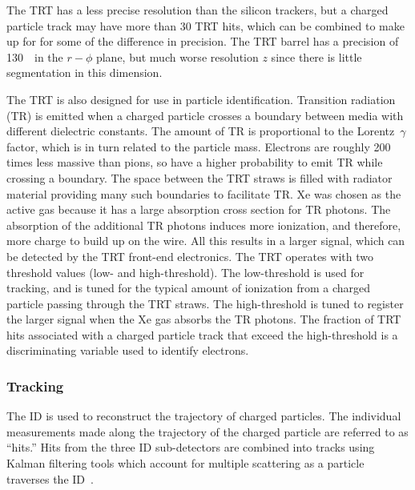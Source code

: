 The TRT has a less precise resolution than the silicon trackers, but a charged
particle track may have more than 30 TRT hits, which can be combined to make
up for for some of the difference in precision.
The TRT barrel has a precision of 130~\um\  in the $r-\phi$ plane, but much
worse resolution $z$ since there is little segmentation in this dimension.

The TRT is also designed for use in particle identification.
Transition radiation (TR) is emitted when a charged particle crosses a boundary
between media with different dielectric constants.
The amount of TR is proportional to the Lorentz~$\gamma$ factor, which is in
turn related to the particle mass.
Electrons are roughly 200 times less massive than pions, so have a higher
probability to emit TR while crossing a boundary.
The space between the TRT straws is filled with radiator material providing
many such boundaries to facilitate TR.
Xe was chosen as the active gas because it has a large absorption cross section
for TR photons.
The absorption of the additional TR photons induces more ionization, and
therefore, more charge to build up on the wire.
All this results in a larger signal, which can be detected by the TRT
front-end electronics.
The TRT operates with two threshold values (low- and high-threshold).
The low-threshold is used for tracking, and is tuned for the typical amount of
ionization from a charged particle passing through the TRT straws.
The high-threshold is tuned to register the larger signal when the Xe gas
absorbs the TR photons.
The fraction of TRT hits associated with a charged particle track that exceed
the high-threshold is a discriminating variable used to identify electrons.

\FloatBarrier
\subsubsection{Tracking} 
\label{sec:tracking}

The ID is used to reconstruct the trajectory of charged particles.
The individual measurements made along the trajectory of the charged particle
are referred to as ``hits.''
Hits from the three ID sub-detectors are combined into tracks using Kalman
filtering tools which account for multiple scattering as a particle traverses
the ID~\cite{ATLAS-CONF-2014-047,ATLAS-CONF-2012-042}.

